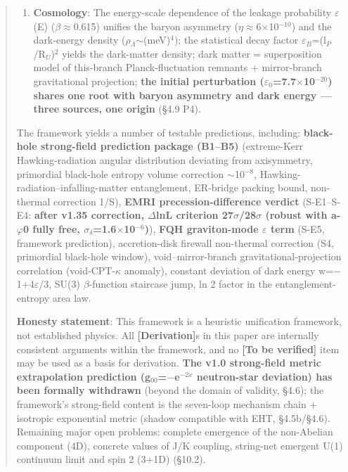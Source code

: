 \documentclass[12pt]{article}
\newcommand{\mtag}[1]{\textbf{[#1]}}
\newcommand{\up}[1]{\ensuremath{^{#1}}}
\newcommand{\down}[1]{\ensuremath{_{#1}}}
\begin{document}
\begin{abstract}
\begin{enumerate}
\item \textbf{Cosmology}: The energy-scale dependence of the leakage probability \ensuremath{\varepsilon}(E) (\ensuremath{\beta}\ensuremath{\approx}0.615) unifies the baryon asymmetry (\ensuremath{\eta}\ensuremath{\approx}6\ensuremath{\times}10\up{-10}) and the dark-energy density (\ensuremath{\rho}\down{\Lambda{}}\ensuremath{\sim}(meV)\up{4}); the statistical decay factor \ensuremath{\varepsilon}\down{B}=(l\down{P}/R\down{U})\up{2} yields the dark-matter density; dark matter = superposition model of this-branch Planck-fluctuation remnants + mirror-branch gravitational projection; \textbf{the initial perturbation (\ensuremath{\varepsilon}\down{0}=7.7\ensuremath{\times}10\up{-20}) shares one root with baryon asymmetry and dark energy --- three sources, one origin} (\S{}4.9 P4).
\end{enumerate}

The framework yields a number of testable predictions, including: \textbf{black-hole strong-field prediction package (B1--B5)} (extreme-Kerr Hawking-radiation angular distribution deviating from axisymmetry, primordial black-hole entropy volume correction \ensuremath{\sim}10\up{-8}, Hawking-radiation--infalling-matter entanglement, ER-bridge packing bound, non-thermal correction 1/S), \textbf{EMRI precession-difference verdict} (S-E1--S-E4: \textbf{after v1.35 correction, \ensuremath{\Delta}lnL criterion 27\ensuremath{\sigma}/28\ensuremath{\sigma} (robust with a-\ensuremath{\varphi}0 fully free, \ensuremath{\sigma}\down{\delta{}}=1.6\ensuremath{\times}10\up{-6})}), \textbf{FQH graviton-mode \ensuremath{\varepsilon} term} (S-E5, framework prediction), accretion-disk firewall non-thermal correction (S4, primordial black-hole window), void--mirror-branch gravitational-projection correlation (void-CPT-\ensuremath{\kappa} anomaly), constant deviation of dark energy w=\ensuremath{-}1+4\ensuremath{\varepsilon}/3, SU(3) \ensuremath{\beta}-function staircase jump, ln 2 factor in the entanglement-entropy area law.

\textbf{Honesty statement}: This framework is a heuristic unification framework, not established physics. All \mtag{Derivation}s in this paper are internally consistent arguments within the framework, and no \mtag{To be verified} item may be used as a basis for derivation. \textbf{The v1.0 strong-field metric extrapolation prediction (g\down{00}=\ensuremath{-}e\up{-2x} neutron-star deviation) has been formally withdrawn} (beyond the domain of validity, \S{}4.6); the framework's strong-field content is the seven-loop mechanism chain + isotropic exponential metric (shadow compatible with EHT, \S{}4.5b/\S{}4.6). Remaining major open problems: complete emergence of the non-Abelian component (4D), concrete values of J/K coupling, string-net emergent U(1) continuum limit and spin 2 (3+1D) (\S{}10.2).



\end{abstract}
\end{document}
